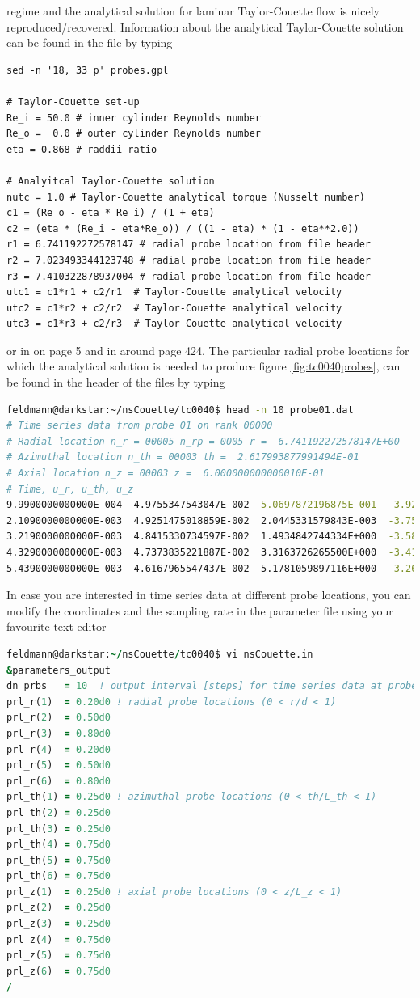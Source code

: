 \documentclass[a4paper, 11pt, DIV=11]{scrartcl}
\begin{document}
regime and the analytical solution for laminar Taylor-Couette flow is nicely
reproduced/recovered. Information about the analytical Taylor-Couette solution can be
found in the  file by typing \eg
\begin{lstlisting}[language=Gnuplot]
sed -n '18, 33 p' probes.gpl

# Taylor-Couette set-up
Re_i = 50.0 # inner cylinder Reynolds number
Re_o =  0.0 # outer cylinder Reynolds number
eta = 0.868 # raddii ratio

# Analyitcal Taylor-Couette solution
nutc = 1.0 # Taylor-Couette analytical torque (Nusselt number)
c1 = (Re_o - eta * Re_i) / (1 + eta)
c2 = (eta * (Re_i - eta*Re_o)) / ((1 - eta) * (1 - eta**2.0))
r1 = 6.741192272578147 # radial probe location from file header
r2 = 7.023493344123748 # radial probe location from file header
r3 = 7.410322878937004 # radial probe location from file header
utc1 = c1*r1 + c2/r1  # Taylor-Couette analytical velocity
utc2 = c1*r2 + c2/r2  # Taylor-Couette analytical velocity
utc3 = c1*r3 + c2/r3  # Taylor-Couette analytical velocity
\end{lstlisting}
or \eg in \cite{Shi2015} on page \num{5} and in \cite{Brauckmann2016} around
page \num{424}. The particular radial probe locations for which the analytical
solution is needed to produce figure \ref{fig:tc0040probes}, can be found in the
header of the  files by typing
\begin{lstlisting}[language=bash]
feldmann@darkstar:~/nsCouette/tc0040$ head -n 10 probe01.dat
# Time series data from probe 01 on rank 00000
# Radial location n_r = 00005 n_rp = 0005 r =  6.741192272578147E+00
# Azimuthal location n_th = 00003 th =  2.617993877991494E-01
# Axial location n_z = 00003 z =  6.000000000000010E-01
# Time, u_r, u_th, u_z
9.9900000000000E-004  4.9755347543047E-002 -5.0697872196875E-001  -3.9262289916098E-001
2.1090000000000E-003  4.9251475018859E-002  2.0445331579843E-003  -3.7513595580142E-001
3.2190000000000E-003  4.8415330734597E-002  1.4934842744334E+000  -3.5808738661681E-001
4.3290000000000E-003  4.7373835221887E-002  3.3163726265500E+000  -3.4181516483879E-001
5.4390000000000E-003  4.6167965547437E-002  5.1781059897116E+000  -3.2637614051804E-001
\end{lstlisting}
In case you are interested in time series data at different probe locations, you
can modify the coordinates and the sampling rate in the parameter file using
your favourite text editor
\begin{lstlisting}[language=Fortran]
feldmann@darkstar:~/nsCouette/tc0040$ vi nsCouette.in
&parameters_output
dn_prbs   = 10  ! output interval [steps] for time series data at probe locations
prl_r(1)  = 0.20d0 ! radial probe locations (0 < r/d < 1)
prl_r(2)  = 0.50d0
prl_r(3)  = 0.80d0
prl_r(4)  = 0.20d0
prl_r(5)  = 0.50d0
prl_r(6)  = 0.80d0
prl_th(1) = 0.25d0 ! azimuthal probe locations (0 < th/L_th < 1)
prl_th(2) = 0.25d0
prl_th(3) = 0.25d0
prl_th(4) = 0.75d0
prl_th(5) = 0.75d0
prl_th(6) = 0.75d0
prl_z(1)  = 0.25d0 ! axial probe locations (0 < z/L_z < 1)
prl_z(2)  = 0.25d0
prl_z(3)  = 0.25d0
prl_z(4)  = 0.75d0
prl_z(5)  = 0.75d0
prl_z(6)  = 0.75d0
/
\end{lstlisting}
\end{document}
